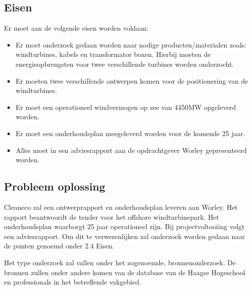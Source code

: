 \subsection{Eisen}
Er moet aan de volgende eisen worden voldaan:
\begin{itemize}
   \item Er moet onderzoek gedaan worden naar nodige producten/materialen zoals: windturbines, kabels en transformator boxen. Hierbij moeten de energieopbrengsten voor twee verschillende turbines worden onderzocht.
   \item Er moeten twee verschillende ontwerpen komen voor de positionering van de windturbines. 
   \item Er moet een operationeel windvermogen op zee van 4450MW opgeleverd worden.
   \item Er moet een onderhoudsplan meegeleverd worden voor de komende 25 jaar.
   \item Alles moet in een adviesrapport aan de opdrachtgever Worley gepresenteerd worden. 
 \end{itemize}

\subsection{Probleem oplossing}
Cleaneco zal een ontwerprapport en onderhoudsplan leveren aan Worley. Het rapport beantwoordt de tender voor het offshore windturbinepark. Het onderhoudsplan waarborgt 25 jaar operationeel zijn. Bij projectvoltooiing volgt een adviesrapport. Om dit te verwezenlijken zal onderzoek worden gedaan naar de punten genoemd onder 2.4 Eisen. 

Het type onderzoek zal vallen onder het zogenoemde, bronnenonderzoek. De bronnen zullen onder andere komen van de database van de Haagse Hogeschool en professionals in het betreffende vakgebied.
